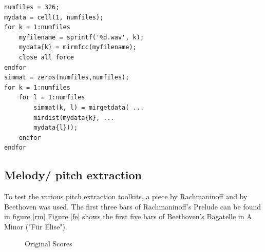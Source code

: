 \lstset{language=Matlab}          %
\FloatBarrier

\begin{lstlisting}[frame=single,label={lst:MIRmat},
caption={MIR Toolkit Similarity},captionpos=b]  % Start your code-block
numfiles = 326;
mydata = cell(1, numfiles);
for k = 1:numfiles
	myfilename = sprintf('%d.wav', k);
	mydata{k} = mirmfcc(myfilename);
	close all force
endfor
simmat = zeros(numfiles,numfiles);
for k = 1:numfiles
	for l = 1:numfiles
		simmat(k, l) = mirgetdata( ...
		mirdist(mydata{k}, ...
		mydata{l}));
	endfor
endfor
\end{lstlisting}
\FloatBarrier


\subsection{Melody/ pitch extraction}\label{midiest}
To test the various pitch extraction toolkits, a piece by Rachmaninoff and by Beethoven was used. The first three bars of Rachmaninoff's Prelude can be found in figure \ref{rm}
Figure \ref{fe} shows the first five bars of Beethoven's Bagatelle in A Minor ("Für Elise").
\begin{figure}[htbp]
	\centering
	\caption{Original Scores}
	\label{fig:sheets}
\end{figure}
